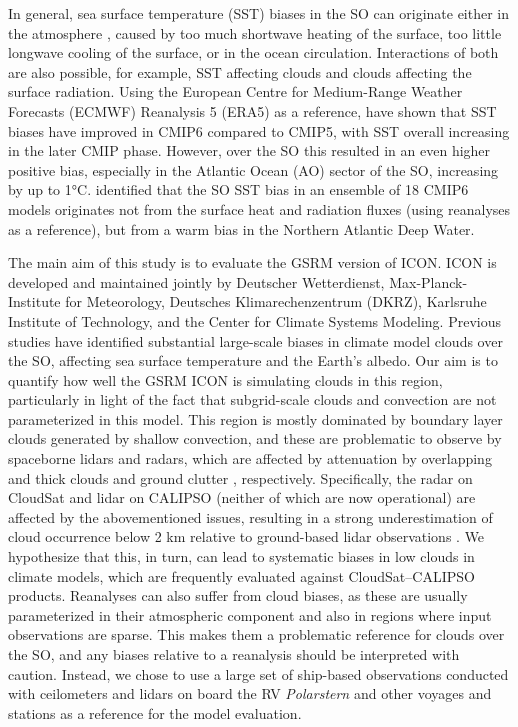 \documentclass[draft]{agujournal2019}
\begin{document}
In general, sea surface temperature (SST) biases in the SO can originate either in the atmosphere \cite{hyder2018}, caused by too much shortwave heating of the surface, too little longwave cooling of the surface, or in the ocean circulation. Interactions of both are also possible, for example, SST affecting clouds and clouds affecting the surface radiation. Using the European Centre for Medium-Range Weather Forecasts (ECMWF) Reanalysis 5 (ERA5) as a reference,  have shown that SST biases have improved in CMIP6 compared to CMIP5, with SST overall increasing in the later CMIP phase. However, over the SO this resulted in an even higher positive bias, especially in the Atlantic Ocean (AO) sector of the SO, increasing by up to 1°C.  identified that the SO SST bias in an ensemble of 18 CMIP6 models originates not from the surface heat and radiation fluxes (using reanalyses as a reference), but from a warm bias in the Northern Atlantic Deep Water.

The main aim of this study is to evaluate the GSRM version of ICON. ICON is developed and maintained jointly by Deutscher Wetterdienst, Max-Planck-Institute for Meteorology, Deutsches Klimarechenzentrum (DKRZ), Karlsruhe Institute of Technology, and the Center for Climate Systems Modeling. Previous studies have identified substantial large-scale biases in climate model clouds over the SO, affecting sea surface temperature and the Earth’s albedo. Our aim is to quantify how well the GSRM ICON is simulating clouds in this region, particularly in light of the fact that subgrid-scale clouds and convection are not parameterized in this model. This region is mostly dominated by boundary layer clouds generated by shallow convection, and these are problematic to observe by spaceborne lidars and radars, which are affected by attenuation by overlapping and thick clouds \cite{mace2009,medeiros2010} and ground clutter \cite{marchand2008}, respectively. Specifically, the radar on CloudSat and lidar on CALIPSO (neither of which are now operational) are affected by the abovementioned issues, resulting in a strong underestimation of cloud occurrence below 2 km relative to ground-based lidar observations \cite{mcerlich2021}. We hypothesize that this, in turn, can lead to systematic biases in low clouds in climate models, which are frequently evaluated against CloudSat--CALIPSO products. Reanalyses can also suffer from cloud biases, as these are usually parameterized in their atmospheric component and also in regions where input observations are sparse. This makes them a problematic reference for clouds over the SO, and any biases relative to a reanalysis should be interpreted with caution. Instead, we chose to use a large set of ship-based observations conducted with ceilometers and lidars on board the RV \emph{Polarstern} and other voyages and stations as a reference for the model evaluation.
\end{document}
